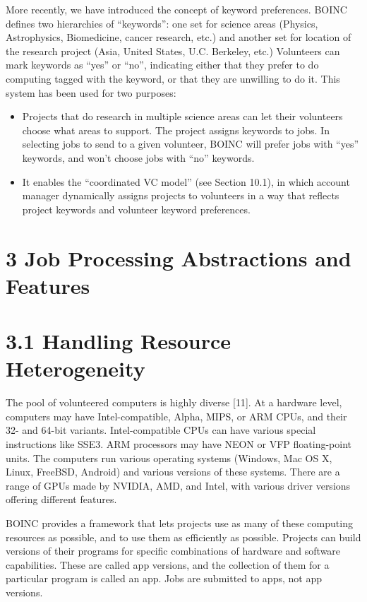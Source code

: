 \documentclass[
]{article}
\providecommand{\tightlist}{%
  \setlength{\itemsep}{0pt}\setlength{\parskip}{0pt}}
\begin{document}
More recently, we have introduced the concept of keyword preferences.
BOINC defines two hierarchies of ``keywords'': one set for science areas
(Physics, Astrophysics, Biomedicine, cancer research, etc.) and another
set for location of the research project (Asia, United States, U.C.
Berkeley, etc.) Volunteers can mark keywords as ``yes'' or ``no'',
indicating either that they prefer to do computing tagged with the
keyword, or that they are unwilling to do it. This system has been used
for two purposes:

\begin{itemize}
\tightlist
\item
  Projects that do research in multiple science areas can let their
  volunteers choose what areas to support. The project assigns keywords
  to jobs. In selecting jobs to send to a given volunteer, BOINC will
  prefer jobs with ``yes'' keywords, and won't choose jobs with ``no''
  keywords.\\
\item
  It enables the ``coordinated VC model'' (see Section 10.1), in which
  account manager dynamically assigns projects to volunteers in a way
  that reflects project keywords and volunteer keyword preferences.
\end{itemize}

\section{3 Job Processing Abstractions and
Features}\label{job-processing-abstractions-and-features}

\section{3.1 Handling Resource
Heterogeneity}\label{handling-resource-heterogeneity}

The pool of volunteered computers is highly diverse {[}11{]}. At a
hardware level, computers may have Intel-compatible, Alpha, MIPS, or ARM
CPUs, and their 32- and 64-bit variants. Intel-compatible CPUs can have
various special instructions like SSE3. ARM processors may have NEON or
VFP floating-point units. The computers run various operating systems
(Windows, Mac OS X, Linux, FreeBSD, Android) and various versions of
these systems. There are a range of GPUs made by NVIDIA, AMD, and Intel,
with various driver versions offering different features.

BOINC provides a framework that lets projects use as many of these
computing resources as possible, and to use them as efficiently as
possible. Projects can build versions of their programs for specific
combinations of hardware and software capabilities. These are called app
versions, and the collection of them for a particular program is called
an app. Jobs are submitted to apps, not app versions.
\end{document}
